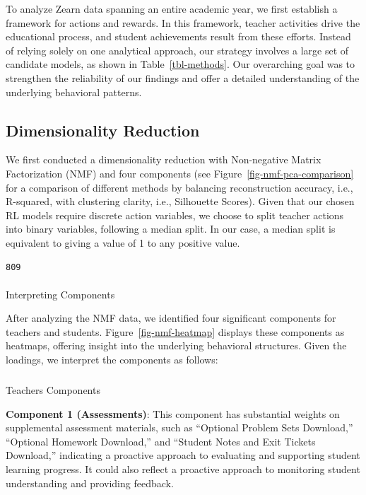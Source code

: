 \documentclass[
  number,
  preprint,
  3p,
  onecolumn]{elsarticle}
\makeatletter
\let\oldparagraph\paragraph
\renewcommand{\paragraph}{
    \@ifstar
      \xxxParagraphStar
      \xxxParagraphNoStar
  }
\newcommand{\xxxParagraphStar}[1]{\oldparagraph*{#1}\mbox{}}
\newcommand{\xxxParagraphNoStar}[1]{\oldparagraph{#1}\mbox{}}
\let\oldsubparagraph\subparagraph
\renewcommand{\subparagraph}{
    \@ifstar
      \xxxSubParagraphStar
      \xxxSubParagraphNoStar
  }
\newcommand{\xxxSubParagraphStar}[1]{\oldsubparagraph*{#1}\mbox{}}
\newcommand{\xxxSubParagraphNoStar}[1]{\oldsubparagraph{#1}\mbox{}}
\makeatother
\begin{document}
To analyze Zearn data spanning an entire academic year, we first
establish a framework for actions and rewards. In this framework,
teacher activities drive the educational process, and student
achievements result from these efforts. Instead of relying solely on one
analytical approach, our strategy involves a large set of candidate
models, as shown in Table~\ref{tbl-methods}. Our overarching goal was to
strengthen the reliability of our findings and offer a detailed
understanding of the underlying behavioral patterns.

\subsection{Dimensionality Reduction}\label{dimensionality-reduction}

We first conducted a dimensionality reduction with Non-negative Matrix
Factorization (NMF) and four components (see
Figure~\ref{fig-nmf-pca-comparison} for a comparison of different
methods by balancing reconstruction accuracy, i.e., R-squared, with
clustering clarity, i.e., Silhouette Scores). Given that our chosen RL
models require discrete action variables, we choose to split teacher
actions into binary variables, following a median split. In our case, a
median split is equivalent to giving a value of 1 to any positive value.

\begin{verbatim}
809
\end{verbatim}

\paragraph{Interpreting Components}\label{interpreting-components}

After analyzing the NMF data, we identified four significant components
for teachers and students. Figure~\ref{fig-nmf-heatmap} displays these
components as heatmaps, offering insight into the underlying behavioral
structures. Given the loadings, we interpret the components as follows:

\subparagraph{Teachers Components}\label{teachers-components}

\textbf{Component 1 (Assessments)}: This component has substantial
weights on supplemental assessment materials, such as ``Optional Problem
Sets Download,'' ``Optional Homework Download,'' and ``Student Notes and
Exit Tickets Download,'' indicating a proactive approach to evaluating
and supporting student learning progress. It could also reflect a
proactive approach to monitoring student understanding and providing
feedback.
\end{document}
